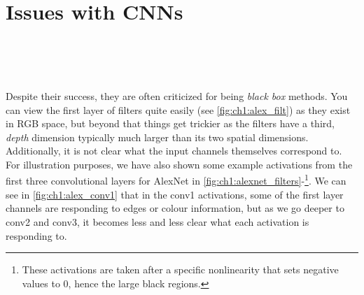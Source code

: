 \section{Issues with CNNs}\label{sec:ch1:motivation}
\begin{figure}
  \centering
  \\
  \\
  \\
  \label{fig:ch1:alexnet_filters}
\end{figure}
Despite their success, they are often criticized for being \emph{black box}
methods. You can view the first layer of filters
quite easily (see \autoref{fig:ch1:alex_filt}) as they exist in RGB
space, but beyond that things get trickier as the filters have a third, \emph{depth}
dimension typically much larger than its two spatial dimensions. Additionally,
it is not clear what the input channels themselves correspond to. For illustration
purposes, we have also shown some example activations from the first three
convolutional layers for AlexNet in
\autoref{fig:ch1:alexnet_filters}-\footnote{These activations are
taken after a specific nonlinearity that sets negative values to 0, hence the
large black regions.}. We can see in \autoref{fig:ch1:alex_conv1} that
in the conv1 activations, some of the first layer channels are responding to
edges or colour information, but as we go deeper to conv2 and conv3, it becomes
less and less clear what each activation is responding to.

